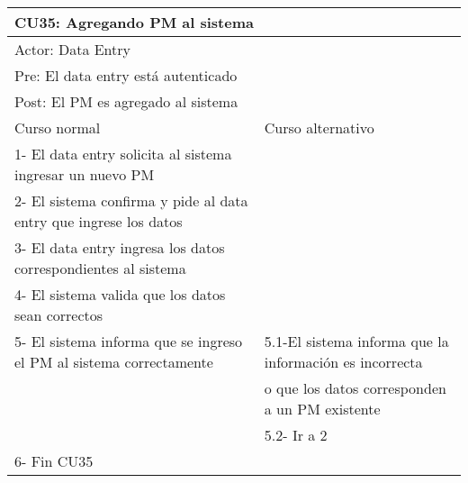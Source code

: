\begin{table}[H]
  \begin{adjustbox}{max width = \textwidth}
  \begin{tabular}{|l|l|}
    \hline
    \multicolumn{2}{|l|}{CU35: Agregando PM al sistema} \\\hline
    \multicolumn{2}{|l|}{Actor: Data Entry} \\\hline
    \multicolumn{2}{|l|}{Pre: El data entry está autenticado} \\\hline
    \multicolumn{2}{|l|}{Post: El PM es agregado al sistema} \\\hline
     Curso normal & Curso alternativo\\ \hline
	 1- El data entry solicita al sistema ingresar un nuevo PM & \\ \hline
     2- El sistema confirma y pide al data entry que ingrese los datos & \\ \hline
     3- El data entry ingresa los datos correspondientes al sistema & \\ \hline
     4- El sistema valida que los datos sean correctos & \\ \hline
     5- El sistema informa que se ingreso el PM al sistema correctamente & 5.1-El sistema informa que la información es incorrecta \\ & o que los datos corresponden a un PM existente  \\ & 5.2- Ir a 2 \\ \hline
     6- Fin CU35 & \\ \hline
  \end{tabular}
  \end{adjustbox}
\end{table}



